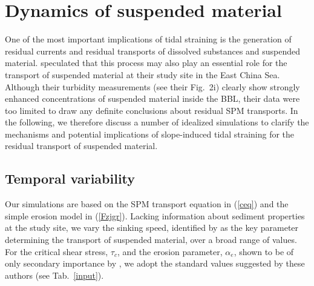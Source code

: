 \section{Dynamics of suspended material} \label{residualsjgr}

One of the most important implications of tidal straining is the
generation of residual currents and residual transports of dissolved
substances and suspended material. \cite{Endohetal2016a} speculated
that this process may also play an essential role for the transport of
suspended material at their study site in the East China Sea. Although
their turbidity measurements (see their Fig.\ 2i) clearly show
strongly enhanced concentrations of suspended material inside the BBL,
their data were too limited to draw any definite conclusions about
residual SPM transports. In the following, we therefore discuss a
number of idealized simulations to clarify the mechanisms and
potential implications of slope-induced tidal straining for the
residual transport of suspended material.

\subsection{Temporal variability}\label{temporal}

Our simulations are based on the SPM transport equation in (\ref{ceq})
and the simple erosion model in (\ref{Fzjgr}). Lacking information about
sediment properties at the study site, we vary the sinking speed,
identified by \cite{schulzumlauf2016} as the key parameter
determining the transport of suspended material, over a broad range of
values. For the critical shear stress, $\tau_c$, and the erosion
parameter, $\alpha_e$, shown to be of only secondary importance by
\cite{schulzumlauf2016}, we adopt the standard values suggested by
these authors (see Tab.\ \ref{input}).

